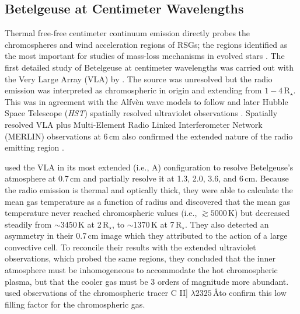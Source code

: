 \documentclass[iop]{emulateapj}
\begin{document}
\subsection{Betelgeuse at Centimeter Wavelengths}
Thermal free-free centimeter continuum emission directly probes the chromospheres and wind acceleration regions of RSGs; the regions identified as the most important for studies of mass-loss mechanisms in evolved stars \citep{holzer_1985}.  The first detailed study of Betelgeuse at centimeter wavelengths was carried out with the Very Large Array (VLA) by \cite{newell_1982}. The source was unresolved but the radio emission was interpreted as chromospheric in origin and extending from $1-4$\,R$_{\star}$. This was in agreement with the Alfv\`en wave models to follow \citep{hartmann_1984} and later Hubble Space Telescope (\textit{HST}) spatially resolved ultraviolet observations \citep{gilliland_1996,uitenbroek_1998}. Spatially resolved VLA plus Multi-Element Radio Linked Interferometer Network (MERLIN) observations at 6\,cm also confirmed the extended nature of the radio emitting region \citep{skinner_1997}. 

\cite{lim_1998} used the VLA in its most extended (i.e., A) configuration to resolve Betelgeuse's atmosphere at 0.7\,cm and partially resolve it at 1.3, 2.0, 3.6, and 6\,cm. Because the radio emission is thermal and optically thick, they were able to calculate the mean gas temperature as a function of radius and discovered that the mean gas temperature never reached chromospheric values (i.e., $\gtrsim 5000\,$K) but decreased steadily from $\sim$3450\,K at 2\,R$_{\star}$, to $\sim$1370\,K at 7\,R$_{\star}$. They also detected an asymmetry in their 0.7\,cm image which they attributed to the action of a large convective cell. To reconcile their results with the extended ultraviolet observations, which probed the same regions, they concluded that the inner atmosphere must be inhomogeneous to accommodate the hot chromospheric plasma, but that the cooler gas must be 3 orders of magnitude more abundant. \cite{harper_2006} used observations of the chromospheric tracer C II] $\lambda 2325\,$\AA to confirm this low filling factor for the chromospheric gas. 
\end{document}
